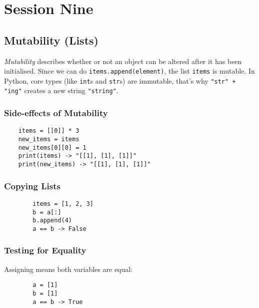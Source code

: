 \section{Session Nine}\label{sec:session_nine}

\subsection{Mutability (Lists)}\label{sub:mutability}

\emph{Mutability} describes whether or not an object can be altered after it has been initialised.
Since we can do \texttt{items.append(element)}, the list \texttt{items} is mutable.
In Python, core types (like \texttt{int}s and \texttt{str}s) are immutable, that's why \texttt{"str" + "ing"} creates a new string \texttt{"string"}.

\subsubsection{Side-effects of Mutability}\label{ssub:side_effects_of_mutability}

\begin{verbatim}
    items = [[0]] * 3
    new_items = items
    new_items[0][0] = 1
    print(items) -> "[[1], [1], [1]]"
    print(new_items) -> "[[1], [1], [1]]"
\end{verbatim}

\subsubsection{Copying Lists}\label{ssub:copying_lists}

\begin{center}
	\begin{verbatim}
        items = [1, 2, 3]
        b = a[:]
        b.append(4)
        a == b -> False   
    \end{verbatim}
\end{center}

\subsubsection{Testing for Equality}\label{ssub:testing_for_equality}

\noindent
Assigning means both variables are equal:

\begin{center}
	\begin{verbatim}
        a = [1]
        b = [1]
        a == b -> True
    \end{verbatim}
\end{center}

